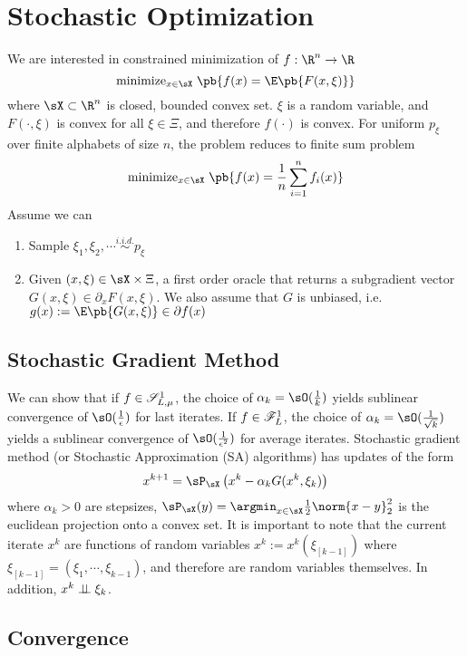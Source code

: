 \documentclass[../summary.tex]{subfiles}
\begin{document}
 

\section{Stochastic Optimization}
We are interested in constrained minimization of $f:\R^n\to\R$ 
\[
    \text{minimize}_{x\in\sX}\; \pb{
        f(x) = \E\pb{F(x,\xi)}
    }
\] 
where $\sX \subset \R^n$ is closed, bounded convex set. $\xi$ is a random variable, and $F(\cdot,\xi)$ is convex for all $\xi\in\Xi$, and therefore $f(\cdot)$ is convex. For uniform $p_{\xi}$ over finite alphabets of size $n$, the problem reduces to finite sum problem
\[
    \text{minimize}_{x\in\sX}\; \pb{
        f(x) = \frac{1}{n} \sum_{i=1}^n f_i(x)
    }    
\] 
Assume we can
\begin{enumerate}
    \item Sample $\xi_1,\xi_2,\cdots \overset{i.i.d.}{\sim} p_{\xi}$
    \item Given $(x,\xi)\in\sX\times\Xi$, a first order oracle that returns a subgradient vector $G(x,\xi) \in\partial_x F(x,\xi)$. We also assume that $G$ is unbiased, i.e. $g(x) := \E\pb{G(x,\xi)}\in\partial f(x)$
\end{enumerate}

\subsection{Stochastic Gradient Method}


We can show that if $f\in\mathscr{S}_{L,\mu}^1$, the choice of $\alpha_k = \sO(\frac{1}{k})$ yields sublinear convergence of $\sO(\frac{1}{\epsilon})$ for last iterates. If $f\in\mathscr{F}_{L}^1$, the choice of $\alpha_k=\sO(\frac{1}{\sqrt{k}})$ yields a sublinear convergence of $\sO(\frac{1}{\epsilon^2})$ for average iterates. Stochastic gradient method (or Stochastic Approximation (SA) algorithms) has updates of the form
\[
    x^{k+1} = \sP_{\sX}\left( x^k - \alpha_k G(x^k, \xi_k) \right)    
\]
where $\alpha_k > 0$ are stepsizes, $\sP_{\sX}(y) =  \argmin_{x\in\sX} \frac{1}{2}\norm{x-y}_2^2$ is the euclidean projection onto a convex set. It is important to note that the current iterate $x^k$ are functions of random variables $x^k := x^k(\xi_{[k-1]})$ where $\xi_{[k-1]} = (\xi_1,\cdots,\xi_{k-1})$, and therefore are random variables themselves. In addition, $x^k \perp\!\!\!\perp \xi_k$. 

\subsection{Convergence}
\end{document}
